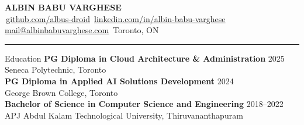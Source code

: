\documentclass{resume} %
\begin{document}
\vspace*{-20pt} %
\begin{center}
  {\bfseries\Huge ALBIN BABU VARGHESE}\\[2pt]
  \small
  \,\href{https://github.com/albus-droid}{github.com/albus-droid} \quad
  \,\href{https://www.linkedin.com/in/albin-babu-varghese/}{linkedin.com/in/albin-babu-varghese} \quad
  \,\href{mailto:mail@albinbabuvarghese.com}{mail@albinbabuvarghese.com} \quad
  \,Toronto, ON
\end{center}
\vspace{1pt}
\hrule
\vspace{4pt}

\begin{rSection}{Education}
{\bf PG Diploma in Cloud Architecture \& Administration} \hfill 2025\\
Seneca Polytechnic, Toronto\\[2pt]
{\bf PG Diploma in Applied AI Solutions Development} \hfill 2024\\
George Brown College, Toronto\\[2pt]
{\bf Bachelor of Science in Computer Science and Engineering} \hfill 2018–2022\\
APJ Abdul Kalam Technological University, Thiruvananthapuram
\end{rSection}
\end{document}
